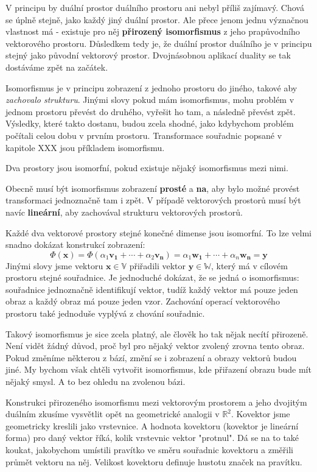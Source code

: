 \documentclass[a5paper,12pt]{amsbook}
\theoremstyle{definition}
\newcommand{\myvec}[1]{\bm{#1}}
\newcommand{\myspace}[1]{\mathbb{#1}}
\newcommand{\mymap}[1]{#1}
\begin{document}
V principu by duální prostor duálního prostoru ani nebyl příliš zajímavý. Chová se úplně stejně, jako
každý jiný duální prostor. Ale přece jenom jednu význačnou vlastnost má - existuje pro něj
\textbf{přirozený isomorfismus} z jeho prapůvodního vektorového prostoru. Důsledkem tedy je, že duální
prostor duálního je v principu stejný jako původní vektorový prostor. Dvojnásobnou aplikací duality
se tak dostáváme zpět na začátek.

Isomorfismus je v principu zobrazení z jednoho prostoru do jiného, takové aby \textit{zachovalo strukturu}.
Jinými slovy pokud mám isomorfismus, mohu problém v jednom prostoru převést do druhého, vyřešit ho tam,
a následně převést zpět. Výsledky, které takto dostanu, budou zcela shodné, jako kdybychom problém počítali
celou dobu v prvním prostoru. Transformace souřadnic popsané v kapitole XXX jsou příkladem isomorfismu.

Dva prostory jsou isomorfní, pokud existuje nějaký isomorfismus mezi nimi.

Obecně musí být isomorfismus zobrazení \textbf{prosté} a \textbf{na}, aby bylo možné provést transformaci
jednoznačně tam i zpět. V případě vektorových prostorů musí být navíc \textbf{lineární}, aby zachovával
strukturu vektorových prostorů.

\medskip\noindent
Každé dva vektorové prostory stejné konečné dimense jsou isomorfní. To lze velmi snadno dokázat konstrukcí
zobrazení:
\begin{equation*}
\mymap{\Phi(\myvec{x})} = \mymap{\Phi(\alpha_1\myvec{v_1} + \cdots + \alpha_2\myvec{v_n})} = \alpha_1\myvec{w_1}
 + \cdots + \alpha_n\myvec{w_n} = \myvec{y}
\end{equation*}
Jinými slovy jsme vektoru $\myvec{x} \in \myspace{V}$ přiřadili vektor $\myvec{y} \in \myspace{W}$, který má
v cílovém prostoru stejné souřadnice. Je jednoduché dokázat, že se jedná o isomorfismus: souřadnice jednoznačně
identifikují vektor, tudíž každý vektor má pouze jeden obraz a každý obraz má pouze jeden vzor. Zachování
operací vektorového prostoru také jednoduše vyplývá z chování souřadnic.

Takový isomorfismus je sice zcela platný, ale člověk ho tak nějak necítí přirozeně. Není vidět žádný důvod,
proč byl pro nějaký vektor zvolený zrovna tento obraz. Pokud změníme některou z bází, změní se i zobrazení
a obrazy vektorů budou jiné. My bychom však chtěli vytvořit isomorfismus, kde přiřazení obrazu bude mít
nějaký smysl. A to bez ohledu na zvolenou bázi.

\medskip\noindent
Konstrukci přirozeného isomorfismu mezi vektorovým prostorem a jeho dvojitým duálním zkusíme vysvětlit opět
na geometrické analogii v $\mathbb{R}^2$. Kovektor jsme geometricky kreslili jako vrstevnice. A hodnota kovektoru
(kovektor je lineární forma) pro daný vektor říká, kolik vrstevnic vektor "protnul". Dá se na to také koukat,
jakobychom umístili pravítko ve směru souřadnic kovektoru a změřili průmět vektoru na něj. Velikost
kovektoru definuje hustotu značek na pravítku.
\end{document}
